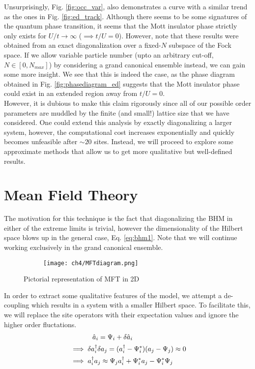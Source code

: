 Unsurprisingly, Fig. \ref{fig:occ_var}, also demonstrates a curve with a similar trend as the ones in Fig. \ref{fig:ed_track}. Although there seems to be some signatures of the quantum phase transition, it seems that the Mott insulator phase strictly only exists for $U/t \to \infty$  ($\implies t/U = 0$). However, note that these results were obtained from an exact diagonalization over a fixed-$N$ subspace of the Fock space. If we allow variable particle number (upto an arbitrary cut-off, $N \in [0, N_{max}]$) by considering a grand canonical ensemble instead, we can gain some more insight. We see that this is indeed the case, as the phase diagram obtained in Fig. \ref{fig:phasediagram_ed} suggests that the Mott insulator phase could exist in an extended region away from $t/U = 0$.
\vspace{0.5cm}\\
However, it is dubious to make this claim rigorously since all of our possible order parameters are muddled by the finite (and small!) lattice size that we have considered. One could extend this analysis by exactly diagonalizing a larger system, however, the computational cost increases exponentially and quickly becomes unfeasible after $\sim 20$ sites. Instead, we will proceed to explore some approximate methods that allow us to get more qualitative but well-defined results. 

\section{Mean Field Theory}\label{sec:bhm_mft}
The motivation for this technique is the fact that diagonalizing the BHM in either of the extreme limits is trivial, however the dimensionality of the Hilbert space blows up in the general case, Eq. \eqref{eq:bhm1}. Note that we will continue working exclusively in the grand canonical ensemble. 
\begin{figure}[!htb]
    \centering
    \begin{subfigure}[b]{\textwidth}  %
        \centering
        \texttt{[image: ch4/MFTdiagram.png]}
    \end{subfigure}
    \caption{Pictorial representation of MFT in 2D}
    \label{}
\end{figure}
\FloatBarrier \!\!\!\!\!\!\!\!\!\!\!

In order to extract some qualitative features of the model, we attempt a de-coupling which results in a system with a smaller Hilbert space. To facilitate this, we will replace the site operators with their expectation values and ignore the higher order fluctations.
\begin{align}\label{eq:decoupling_scheme}
    &\hspace{1.2cm}\hat{a}_i = \Psi_i + \delta \hat{a}_i \nonumber \\
    &\implies \delta a_i^{\dagger} \delta a_j = (a_i^{\dagger} - \Psi_i^*)(a_j - \Psi_j) \approx 0 \nonumber \\
    &\implies a_i^{\dagger}a_j \approx \Psi_ja_i^{\dagger} + \Psi_i^*a_j - \Psi_i^*\Psi_j
\end{align}

